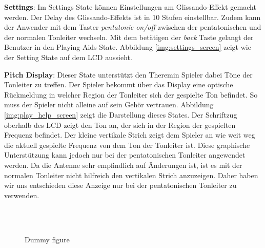 \textbf{Settings}:
Im Settings State können Einstellungen am Glissando-Effekt gemacht werden. Der Delay des Glissando-Effekts ist in 10 Stufen einstellbar. Zudem kann der Anwender mit dem Taster \textit{pentatonic on/off} zwischen der pentatonischen und der normalen Tonleiter wechseln. Mit dem betätigen der \textit{back} Taste gelangt der Benutzer in den Playing-Aids State. Abbildung \ref{img:settings_screen} zeigt wie der Setting State auf dem LCD aussieht.

\textbf{Pitch Display}:
Dieser State unterstützt den Theremin Spieler dabei Töne der Tonleiter zu treffen. Der Spieler bekommt über das Display eine optische Rückmeldung in welcher Region der Tonleiter sich der gespielte Ton befindet. So muss der Spieler nicht alleine auf sein Gehör vertrauen.
Abbildung \ref{img:play_help_screen} zeigt die Darstellung dieses States.  
Der Schriftzug oberhalb des LCD zeigt den Ton an, der sich in der Region der gespielten Frequenz befindet. 
Der kleine vertikale Strich zeigt dem Spieler an wie weit weg die aktuell gespielte Frequenz von dem Ton der Tonleiter ist. 
Diese graphische Unterstützung kann jedoch nur bei der pentatonischen Tonleiter angewendet werden. Da die Antenne sehr empfindlich auf Änderungen ist, ist es mit der normalen Tonleiter nicht hilfreich den vertikalen Strich anzuzeigen. Daher haben wir uns entschieden diese Anzeige nur bei der pentatonischen Tonleiter zu verwenden.

\begin{figure}[!ht]
	\hfill
	\hfill
	\\
	\hfill
	\hfill
	\\
	\hfill
	\hfill
	\hfill

	\caption{Dummy figure}
	\label{fig:dummy}
\end{figure}
